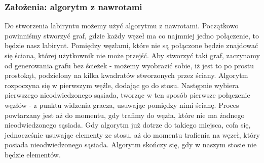 \documentclass[oneside,polski,logo]{amuthesis}
\begin{document}
\subsubsection{Założenia: algorytm z nawrotami}
Do stworzenia labiryntu możemy użyć algorytmu z nawrotami. Początkowo powinniśmy stworzyć graf, gdzie każdy węzeł ma co najmniej jedno połączenie, to będzie nasz labirynt. Pomiędzy węzłami, które nie są połączone będzie znajdować się ściana, której użytkownik nie może przejść. Aby stworzyć taki graf, zaczynamy od generowania grafu bez ścieżek - możemy wyobrazić sobie, iż jest to po prostu prostokąt, podzielony na kilka kwadratów stworzonych przez ściany. Algorytm rozpoczyna się w pierwszym węźle, dodając go do stosu. Następnie wybiera pierwszego nieodwiedzonego sąsiada, tworząc w ten sposób pierwsze połączenie węzłów - z punktu widzenia gracza, usuwając pomiędzy nimi ścianę. Proces powtarzany jest aż do momentu, gdy trafimy do węzła, które nie ma żadnego nieodwiedzonego sąsiada. Gdy algorytm już dotrze do takiego miejsca, cofa się, jednocześnie usuwając elementy ze stosu, aż do momentu trafienia na węzeł, który posiada nieodwiedzonego sąsiada. Algorytm skończy się, gdy w naszym stosie nie będzie elementów. \cite{maze}
\end{document}
